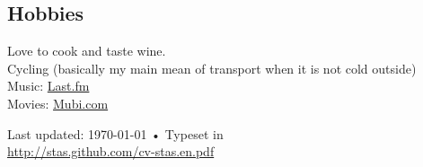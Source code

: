 \documentclass[10pt, a4paper]{article}
\begin{document}
\subsection*{Hobbies}
Love to cook and taste wine.\\
Cycling (basically my main mean of transport when it is not cold outside)\\
Music: \href{http://www.last.fm/user/c00l2sv}{Last.fm}\\
Movies: \href{http://mubi.com/users/287401}{Mubi.com}


\vfill{}

\begin{center}
{\scriptsize  Last updated: \today\- •\- 
Typeset in \href{http://nitens.org/taraborelli/cvtex}{\XeTeX }\\
\href{http://stas.github.com/cv-stas.en.pdf}{http://stas.github.com/cv-stas.en.pdf}}
\end{center}
\end{document}
